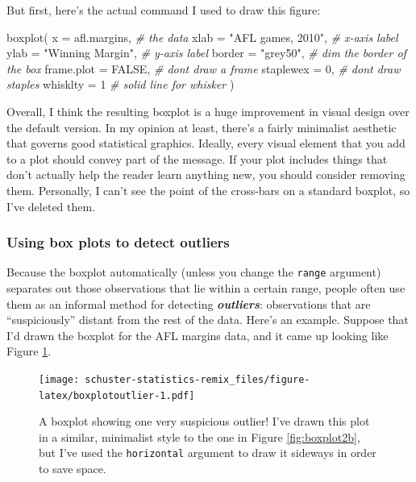 \documentclass[
]{book}
\newenvironment{Shaded}{\begin{snugshade}}{\end{snugshade}}
\newcommand{\AttributeTok}[1]{\textcolor[rgb]{0.77,0.63,0.00}{#1}}
\newcommand{\CommentTok}[1]{\textcolor[rgb]{0.56,0.35,0.01}{\textit{#1}}}
\newcommand{\ConstantTok}[1]{\textcolor[rgb]{0.00,0.00,0.00}{#1}}
\newcommand{\DecValTok}[1]{\textcolor[rgb]{0.00,0.00,0.81}{#1}}
\newcommand{\FunctionTok}[1]{\textcolor[rgb]{0.00,0.00,0.00}{#1}}
\newcommand{\NormalTok}[1]{#1}
\newcommand{\StringTok}[1]{\textcolor[rgb]{0.31,0.60,0.02}{#1}}
\begin{document}
But first, here's the actual command I used to draw this figure:

\begin{Shaded}
\begin{Highlighting}[]
\FunctionTok{boxplot}\NormalTok{( }\AttributeTok{x =}\NormalTok{ afl.margins,           }\CommentTok{\# the data}
          \AttributeTok{xlab =} \StringTok{"AFL games, 2010"}\NormalTok{,  }\CommentTok{\# x{-}axis label}
          \AttributeTok{ylab =} \StringTok{"Winning Margin"}\NormalTok{,   }\CommentTok{\# y{-}axis label}
          \AttributeTok{border =} \StringTok{"grey50"}\NormalTok{,         }\CommentTok{\# dim the border of the box}
          \AttributeTok{frame.plot =} \ConstantTok{FALSE}\NormalTok{,        }\CommentTok{\# don\textquotesingle{}t draw a frame}
          \AttributeTok{staplewex =} \DecValTok{0}\NormalTok{,             }\CommentTok{\# don\textquotesingle{}t draw staples}
          \AttributeTok{whisklty =} \DecValTok{1}               \CommentTok{\# solid line for whisker }
\NormalTok{ )}
\end{Highlighting}
\end{Shaded}

Overall, I think the resulting boxplot is a huge improvement in visual design over the default version. In my opinion at least, there's a fairly minimalist aesthetic that governs good statistical graphics. Ideally, every visual element that you add to a plot should convey part of the message. If your plot includes things that don't actually help the reader learn anything new, you should consider removing them. Personally, I can't see the point of the cross-bars on a standard boxplot, so I've deleted them.

\hypertarget{boxplotoutliers}{%
\subsubsection{Using box plots to detect outliers}\label{boxplotoutliers}}

Because the boxplot automatically (unless you change the \texttt{range} argument) separates out those observations that lie within a certain range, people often use them as an informal method for detecting \textbf{\emph{outliers}}: observations that are ``suspiciously'' distant from the rest of the data. Here's an example. Suppose that I'd drawn the boxplot for the AFL margins data, and it came up looking like Figure \ref{fig:boxplotoutlier}.

\begin{figure}
\centering
\texttt{[image: schuster-statistics-remix\_files/figure-latex/boxplotoutlier-1.pdf]}
\caption{\label{fig:boxplotoutlier}A boxplot showing one very suspicious outlier! I've drawn this plot in a similar, minimalist style to the one in Figure \ref{fig:boxplot2b}, but I've used the \texttt{horizontal} argument to draw it sideways in order to save space.}
\end{figure}
\end{document}
